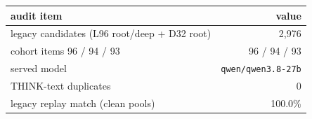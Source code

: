 \begin{tabular}{lr}\toprule audit item & value\\\midrule
legacy candidates (L96 root/deep + D32 root) & 2,976\\
cohort items 96 / 94 / 93 & 96 / 94 / 93\\
served model & \texttt{qwen/qwen3.8-27b}\\
THINK-text duplicates & 0\\
legacy replay match (clean pools) & 100.0\%\\
\bottomrule\end{tabular}
